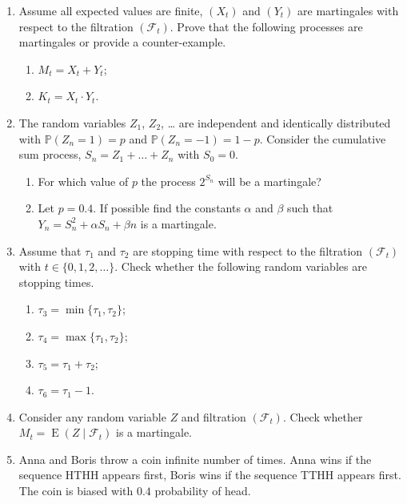 \documentclass[12pt]{article}
\DeclareMathOperator{\E}{E}
\def \cF{\mathcal{F}}
\def \P{\mathbb{P}}
\begin{document}
\begin{enumerate}


\item Assume all expected values are finite, $(X_t)$ and $(Y_t)$ are martingales with respect to the filtration $(\cF_t)$.
Prove that the following processes are martingales or provide a counter-example.

\begin{enumerate}
  \item $M_t = X_t + Y_t$;
  \item $K_t = X_t \cdot Y_t$.
\end{enumerate}

\item The random variables $Z_1$, $Z_2$, \ldots{}  are independent and identically distributed with 
$\P(Z_n = 1) = p$ and $\P(Z_n = -1) = 1-p$. Consider the cumulative sum process, $S_n = Z_1 + \ldots + Z_n$ with $S_0=0$.

\begin{enumerate}
  \item For which value of $p$ the process $2^{S_n}$ will be a martingale?
  \item Let $p=0.4$. 
  If possible find the constants $\alpha$ and $\beta$ such that $Y_n = S_n^2 + \alpha S_n + \beta n$ is a martingale.
\end{enumerate}

\item Assume that $\tau_1$ and $\tau_2$ are stopping time with respect to the filtration $(\cF_t)$ with $t \in \{0, 1, 2, \ldots\}$.
Check whether the following random variables are stopping times. 

\begin{enumerate}
  \item $\tau_3 = \min\{\tau_1, \tau_2\}$;
  \item $\tau_4 = \max\{\tau_1, \tau_2\}$;
  \item $\tau_5 = \tau_1 + \tau_2$;
  \item $\tau_6 = \tau_1 - 1$.
\end{enumerate}


\item Consider any random variable $Z$ and filtration $(\cF_t)$. 
Check whether $M_t = \E(Z \mid \cF_t)$ is a martingale.


\item Anna and Boris throw a coin infinite number of times.
Anna wins if the sequence HTHH appears first, Boris wins if the sequence TTHH appears first. 
The coin is biased with $0.4$ probability of head.


\end{enumerate}
\end{document}
